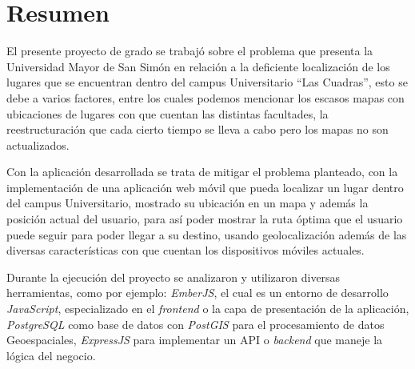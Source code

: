 \chapter*{Resumen} %





El presente proyecto de grado se trabajó sobre el problema que presenta la Universidad Mayor de San Simón en relación a la deficiente localización de los lugares que se encuentran dentro del campus Universitario ``Las Cuadras'', esto se debe a varios factores, entre los cuales podemos mencionar los escasos mapas con ubicaciones de lugares con que cuentan las distintas facultades, la reestructuración que cada cierto tiempo se lleva a cabo pero los mapas no son actualizados.

Con la aplicación desarrollada se trata de mitigar el problema planteado, con la implementación de una aplicación web móvil que pueda localizar un lugar dentro del campus Universitario, mostrado su ubicación en un mapa y además la posición actual del usuario, para así poder mostrar la ruta óptima que el usuario puede seguir para poder llegar a su destino, usando geolocalización además de las diversas características con que cuentan los dispositivos móviles actuales.

Durante la ejecución del proyecto se analizaron y utilizaron diversas herramientas, como por ejemplo: \emph{EmberJS}, el cual es un entorno de desarrollo \emph{JavaScript}, especializado en el \emph{frontend} o la capa de presentación de la aplicación, \emph{PostgreSQL} como base de datos con \emph{PostGIS} para el procesamiento de datos Geoespaciales, \emph{ExpressJS} para implementar un API o \emph{backend} que maneje la lógica del negocio.


